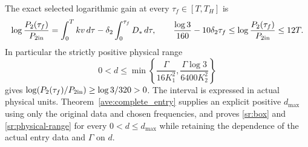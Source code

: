 \begin{theorem}
The exact selected logarithmic gain at every
$\tau_f\in[T,T_H]$ is
\begin{equation}\label{sr:gain}
 \log\frac{P_2(\tau_f)}{P_{2\rm in}}
 =\int_0^{T}kv\,d\tau-\delta_2\int_0^{\tau_f}D_*\,d\tau,
 \qquad
 \frac{\log3}{160}-10\delta_2\tau_f
 \leq\log\frac{P_2(\tau_f)}{P_{2\rm in}}
 \leq12T.
\end{equation}
In particular the strictly positive physical range
\begin{equation}\label{sr:physical-range}
 0<d\leq
 \min\left\{\frac{\Gamma}{16K_1^2},
 \frac{\Gamma\log3}{6400K_2^2}\right\}
\end{equation}
gives $\log(P_2(\tau_f)/P_{2\rm in})\geq\log3/320>0$.
The interval is expressed in actual physical units.
Theorem~\ref{ave:complete_entry} supplies an explicit positive
$d_{\max}$ using only the original data and chosen frequencies, and
proves \eqref{sr:box} and \eqref{sr:physical-range} for every
$0<d\leq d_{\max}$ while retaining the dependence of the actual
entry data and $\Gamma$ on $d$.
\end{theorem}


